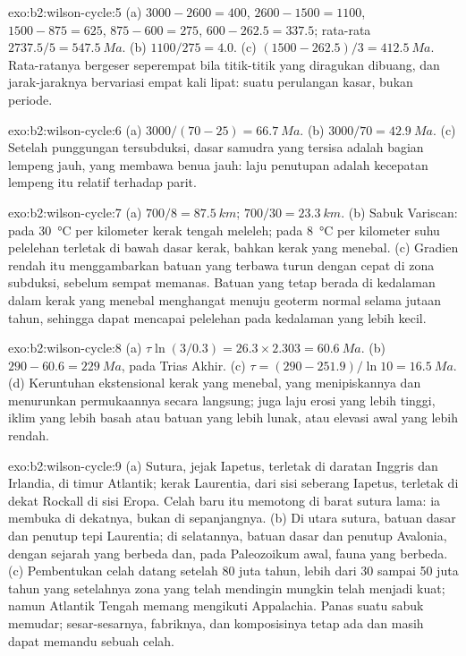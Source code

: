 \begin{solution}{exo:b2:wilson-cycle:5}
(a) $3000 - 2600 = 400$, $2600 - 1500 = 1100$, $1500 - 875 = 625$, $875 - 600 = 275$, $600 -
262.5 = 337.5$; rata-rata $2737.5/5 = \qty{547.5}{Ma}$. (b) $1100/275 = 4.0$. (c) $(1500 -
262.5)/3 = \qty{412.5}{Ma}$. Rata-ratanya bergeser seperempat bila titik-titik yang diragukan dibuang,
dan jarak-jaraknya bervariasi empat kali lipat: suatu perulangan kasar, bukan periode.
\end{solution}

\begin{solution}{exo:b2:wilson-cycle:6}
(a) $3000/(70 - 25) = \qty{66.7}{Ma}$. (b) $3000/70 = \qty{42.9}{Ma}$. (c) Setelah punggungan
tersubduksi, dasar samudra yang tersisa adalah bagian lempeng jauh, yang membawa benua
jauh: laju penutupan adalah kecepatan lempeng itu relatif terhadap parit.
\end{solution}

\begin{solution}{exo:b2:wilson-cycle:7}
(a) $700/8 = \qty{87.5}{km}$; $700/30 = \qty{23.3}{km}$. (b) Sabuk Variscan: pada
\qty{30}{\celsius} per kilometer kerak tengah meleleh; pada \qty{8}{\celsius} per kilometer
suhu pelelehan terletak di bawah dasar kerak, bahkan kerak yang menebal. (c) Gradien rendah itu
menggambarkan batuan yang terbawa turun dengan cepat di zona subduksi, sebelum sempat memanas. Batuan yang
tetap berada di kedalaman dalam kerak yang menebal menghangat menuju geoterm normal selama jutaan tahun, sehingga dapat
mencapai pelelehan pada kedalaman yang lebih kecil.
\end{solution}

\begin{solution}{exo:b2:wilson-cycle:8}
(a) $\tau\ln(3/0.3) = 26.3\times2.303 = \qty{60.6}{Ma}$. (b) $290 - 60.6 = \qty{229}{Ma}$, pada
Trias Akhir. (c) $\tau = (290 - 251.9)/\ln10 = \qty{16.5}{Ma}$. (d) Keruntuhan ekstensional
kerak yang menebal, yang menipiskannya dan menurunkan permukaannya secara langsung; juga laju
erosi yang lebih tinggi, iklim yang lebih basah atau batuan yang lebih lunak, atau elevasi awal yang lebih rendah.
\end{solution}

\begin{solution}{exo:b2:wilson-cycle:9}
(a) Sutura, jejak Iapetus, terletak di daratan Inggris dan Irlandia, di timur
Atlantik; kerak Laurentia, dari sisi seberang Iapetus, terletak di dekat Rockall di sisi
Eropa. Celah baru itu memotong di barat sutura lama: ia membuka di dekatnya, bukan di sepanjangnya.
(b) Di utara sutura, batuan dasar dan penutup tepi Laurentia; di selatannya, batuan dasar dan penutup
Avalonia, dengan sejarah yang berbeda dan, pada Paleozoikum awal, fauna yang berbeda. (c) Pembentukan celah
datang setelah 80 juta tahun, lebih dari 30 sampai 50 juta tahun yang setelahnya zona yang telah mendingin mungkin telah menjadi
kuat; namun Atlantik Tengah memang mengikuti Appalachia. Panas suatu sabuk memudar; sesar-sesarnya,
fabriknya, dan komposisinya tetap ada dan masih dapat memandu sebuah celah.
\end{solution}

